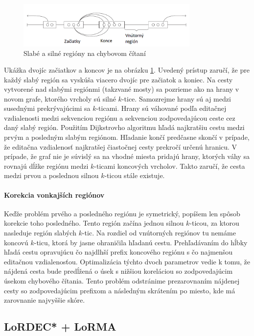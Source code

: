 \begin{figure}
    \centering
    \includegraphics[width=0.8\textwidth]{images/lordec.png}
    \caption{Slabé a silné regióny na chybovom čítaní}
    \label{fig:weakstrongregions}
\end{figure}
Ukážka dvojíc začiatkov a koncov je na obrázku \ref{fig:weakstrongregions}. Uvedený prístup zaručí, že pre každý slabý región sa vyskúša viacero dvojíc pre začiatok a koniec. Na cesty vytvorené nad slabými regiónmi (takzvané mosty) sa pozrieme ako na hrany v novom grafe, ktorého vrcholy sú silné $k$-tice. Samozrejme hrany sú aj medzi susednými prekrývajúcimi sa $k$-ticami. Hrany sú váhované podľa editačnej vzdialenosti medzi sekvenciou regiónu a sekvenciou zodpovedajúcou ceste cez daný slabý región. Použitím Dijkstrovho algoritmu hľadá najkratšiu cestu medzi prvým a posledným slabým regiónom. Hľadanie končí predčasne skončí v prípade, že editačna vzdialenosť najkratšej čiastočnej cesty prekročí určenú hranicu. V prípade, že graf nie je súvislý sa na vhodné miesta pridajú hrany, ktorých váhy sa rovnajú dĺžke regiónu medzi $k$-ticami koncových vrcholov. Takto zaručí, že cesta medzi prvou a poslednou silnou $k$-ticou stále existuje.

\paragraph{Korekcia vonkajších regiónov}

Keďže problém prvého a posledného regiónu je symetrický, popíšem len spôsob korekcie toho posledného. Tento región začína jednou silnou $k$-ticou, za ktorou nasleduje región slabých $k$-tic. Na rozdiel od vnútorných regiónov tu nemáme koncovú $k$-ticu, ktorá by jasne ohraničila hľadanú cestu. Prehľadávaním do hĺbky hľadá cestu opravujúcu čo najdlhší prefix koncového regiónu s čo najmenšou editačnou vzdialenosťou. Optimalizácia týchto dvoch parametrov vedie k tomu, že nájdená cesta bude predĺžená o úsek s nižšiou koreláciou so zodpovedajúcim úsekom chybového čítania. Tento problém odstránime prezarovnaním nájdenej cesty so zodpovedajúcim prefixom a následným skrátením po miesto, kde má zarovnanie najvyššie skóre.

\subsection{LoRDEC* + LoRMA}

